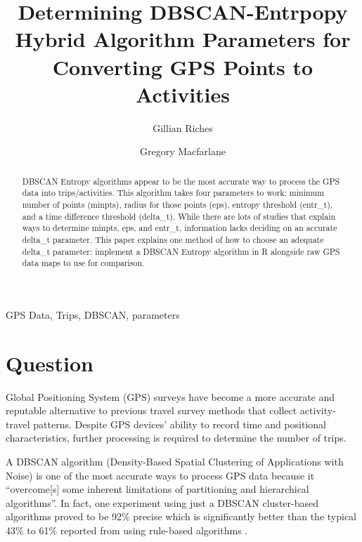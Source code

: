 \documentclass[3p, authoryear]{elsarticle} %
\begin{document}
\begin{frontmatter}

  \title{Determining DBSCAN-Entrpopy Hybrid Algorithm Parameters for Converting GPS Points to Activities}
    \author[Brigham Young University]{Gillian Riches}
    \author[Brigham Young University]{Gregory Macfarlane}
      \address[Brigham Young University]{Civil and Environmental Engineering Department, 232 Engineering Building, Provo, Utah 84602}
  
  \begin{abstract}
  DBSCAN Entropy algorithms appear to be the most accurate way to process the GPS data into trips/activities. This algorithm takes
  four parameters to work: minimum number of points (minpts), radius for those points (eps), entropy threshold (entr\_t),
  and a time difference threshold (delta\_t). While there are lots of studies that explain ways to
  determine minpts, eps, and entr\_t, information lacks deciding on
  an accurate delta\_t parameter. This paper explains one method of how to choose an adequate delta\_t parameter: implement a DBSCAN Entropy algorithm in R alongside raw GPS data maps to use for comparison.
  \end{abstract}
   \begin{keyword} GPS Data, Trips, DBSCAN, parameters\end{keyword}
 \end{frontmatter}

\hypertarget{question}{%
\section{Question}\label{question}}

Global Positioning System (GPS) surveys have become a more accurate and reputable alternative to previous travel survey methods that collect activity-travel patterns. Despite GPS devices' ability to record time and positional characteristics, further processing is required to determine the number of trips.

A DBSCAN algorithm (Density-Based Spatial Clustering of Applications with Noise) is one of the most accurate ways to process GPS data because it ``overcome{[}s{]} some inherent limitations of partitioning and hierarchical algorithms''\citep{DBSCANWeb2019}. In fact, one experiment \citep{DBAlgorithm2017} using just a DBSCAN cluster-based algorithms proved to be 92\% precise which is significantly better than the typical 43\% to 61\% reported from using rule-based algorithms \citep{reviewOfMethods2014}.
\end{document}
